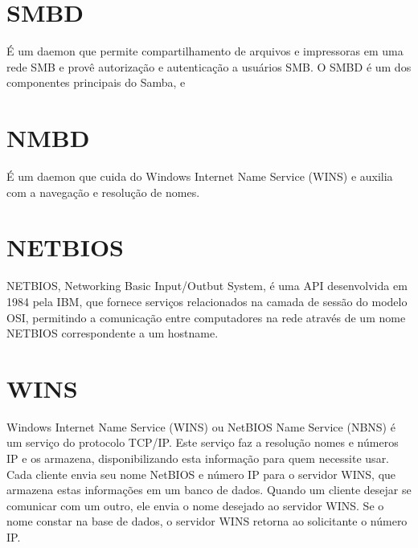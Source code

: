 
\section{SMBD}

É um daemon que permite compartilhamento de arquivos e impressoras em uma rede SMB e provê autorização e autenticação a usuários SMB. O SMBD é um dos componentes principais do Samba, e 

\section{NMBD}

É um daemon que cuida do Windows Internet Name Service (WINS) e auxilia com a navegação e resolução de nomes.

\section{NETBIOS}

NETBIOS, Networking Basic Input/Outbut System, é uma API desenvolvida em 1984 pela IBM, que fornece serviços relacionados na camada de sessão do modelo OSI, permitindo a comunicação entre computadores na rede através de um nome NETBIOS correspondente a um hostname.

% 
% 

\section{WINS}

Windows Internet Name Service (WINS) ou NetBIOS Name Service (NBNS) é um serviço do protocolo TCP/IP. Este serviço faz a resolução nomes e números IP e os armazena, disponibilizando esta informação para quem necessite usar. Cada cliente envia seu nome NetBIOS e número IP para o servidor WINS, que armazena estas informações em um banco de dados. Quando um cliente desejar se comunicar com um outro, ele envia o nome desejado ao servidor WINS. Se o nome constar na base de dados, o servidor WINS retorna ao solicitante o número IP.

